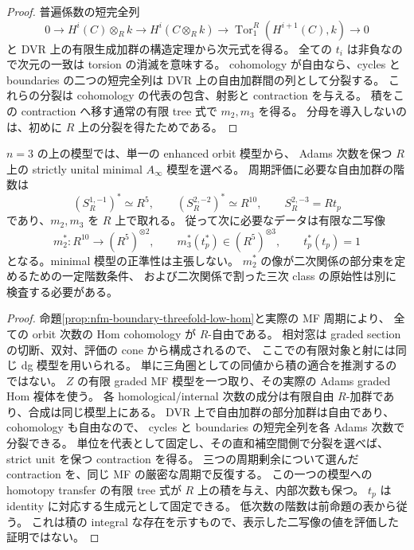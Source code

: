 \begin{proof}
普遍係数の短完全列
\[
 0\to H^i(C)\otimes_Rk\to H^i(C\otimes_Rk)
    \to\operatorname{Tor}_1^R(H^{i+1}(C),k)\to0
\]
と DVR 上の有限生成加群の構造定理から次元式を得る。
全ての $t_i$ は非負なので次元の一致は torsion の消滅を意味する。
cohomology が自由なら、cycles と boundaries の二つの短完全列は
DVR 上の自由加群間の列として分裂する。
これらの分裂は cohomology の代表の包含、射影と contraction を与える。
積をこの contraction へ移す通常の有限 tree 式で $m_2,m_3$ を得る。
分母を導入しないのは、初めに $R$ 上の分裂を得たためである。
\end{proof}

\begin{corollary}
\label{cor:nfm-boundary-threefold-integral-low-products}
$n=3$ の上の模型では、単一の enhanced orbit 模型から、
Adams 次数を保つ $R$ 上の strictly unital minimal $A_\infty$ 模型を選べる。
周期評価に必要な自由加群の階数は
\[
 (S_R^{1,-1})^*\simeq R^5,\qquad
 (S_R^{2,-2})^*\simeq R^{10},\qquad
 S_R^{2,-3}=Rt_p
\]
であり、$m_2,m_3$ を $R$ 上で取れる。
従って次に必要なデータは有限な二写像
\[
 m_2^*:R^{10}\longrightarrow (R^5)^{\otimes2},\qquad
 m_3^*(t_p^*)\in (R^5)^{\otimes3},\qquad t_p^*(t_p)=1
\]
となる。minimal 模型の正準性は主張しない。
$m_2^*$ の像が二次関係の部分束を定めるための一定階数条件、
および二次関係で割った三次 class の原始性は別に検査する必要がある。
\end{corollary}
\begin{proof}
命題\ref{prop:nfm-boundary-threefold-low-hom}と実際の MF 周期により、
全ての orbit 次数の Hom cohomology が $R$-自由である。
相対窓は graded section の切断、双対、評価の cone から構成されるので、
ここでの有限対象と射には同じ dg 模型を用いられる。
単に三角圏としての同値から積の適合を推測するのではない。
$Z$ の有限 graded MF 模型を一つ取り、その実際の Adams graded Hom 複体を使う。
各 homological/internal 次数の成分は有限自由 $R$-加群であり、合成は同じ模型上にある。
DVR 上で自由加群の部分加群は自由であり、cohomology も自由なので、
cycles と boundaries の短完全列を各 Adams 次数で分裂できる。
単位を代表として固定し、その直和補空間側で分裂を選べば、
strict unit を保つ contraction を得る。
三つの周期剰余について選んだ contraction を、同じ MF の厳密な周期で反復する。
この一つの模型への homotopy transfer の有限 tree 式が
$R$ 上の積を与え、内部次数も保つ。
$t_p$ は identity に対応する生成元として固定できる。
低次数の階数は前命題の表から従う。
これは積の integral な存在を示すもので、表示した二写像の値を評価した証明ではない。
\end{proof}

